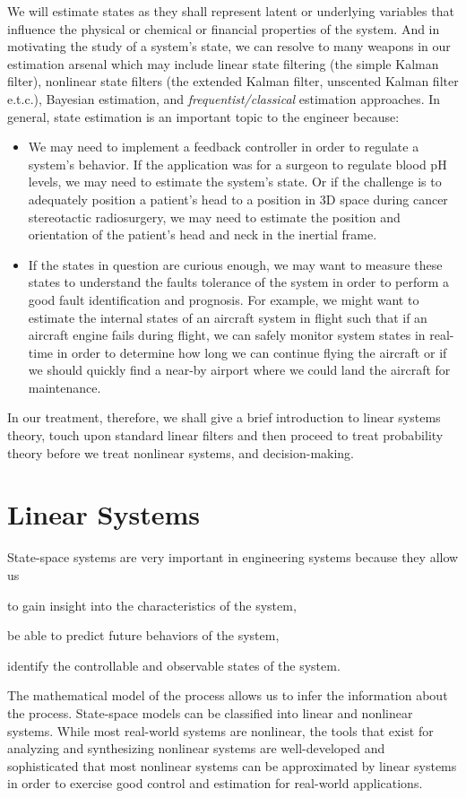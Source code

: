 We will estimate states as they shall represent latent or underlying variables that influence the physical or chemical or financial properties of the system. And in motivating the study of a system's state, we can resolve to many weapons in our estimation arsenal which may include linear state filtering (the simple Kalman filter), nonlinear state filters (the extended Kalman filter, unscented Kalman filter e.t.c.), Bayesian estimation, and \textit{frequentist/classical} estimation approaches. In general, state estimation is an important topic to the engineer because:
%
\begin{itemize}
	\item We may need to implement a feedback controller in order to regulate a system's behavior. If the application was for a surgeon to regulate blood pH levels, we may need to estimate the system's state. Or if the challenge is to adequately position a patient's head to a position in 3D space during cancer stereotactic radiosurgery, we may need to estimate the position and orientation of the patient's head and neck in the inertial frame.
	\item If the states in question are curious enough, we may want to measure these states to understand the faults tolerance of the system in order to perform a good fault identification and prognosis. For example, we might want to estimate the internal states of an aircraft system in flight such that if an aircraft engine fails during flight, we can safely monitor system states in real-time in order to determine how long we can continue flying the aircraft or if we should quickly find a near-by airport where we could land the aircraft for maintenance.
\end{itemize} 
%
In our treatment, therefore, we shall give a brief introduction to linear systems theory, touch upon standard linear filters and then proceed to treat probability theory before we treat nonlinear systems, and decision-making.

\section{Linear Systems}

State-space systems are very important in engineering systems because they allow us 
%
\begin{inparaenum}[(i)]
	\item to gain insight into the characteristics of the system,
	\item be able to predict future behaviors of the system, 
	\item  identify the controllable and observable states of the system.
\end{inparaenum} 
%
The mathematical model of the process allows us to infer the information about the process. State-space models can be classified into linear and nonlinear systems. While most real-world systems are nonlinear, the tools that exist for analyzing and synthesizing nonlinear systems  are well-developed and sophisticated that most nonlinear systems can be approximated by linear systems in order to exercise good control and estimation for real-world applications.

